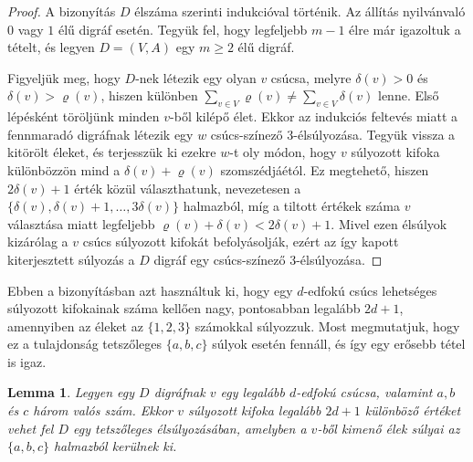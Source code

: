 \documentclass[12pt, a4paper]{report}
\newtheorem{lem}[tét]{Lemma}
\theoremstyle{remark}
\theoremstyle{definition}
\begin{document}
\begin{proof}
A bizonyítás $D$ élszáma szerinti indukcióval történik. Az állítás nyilvánvaló $0$ vagy $1$ élű digráf esetén. Tegyük fel, hogy legfeljebb $m - 1$ élre már igazoltuk a tételt, és legyen $D = (V, A)$ egy $m \geq 2$ élű digráf.

Figyeljük meg, hogy $D$-nek létezik egy olyan $v$ csúcsa, melyre $\delta(v) > 0$ és $\delta(v) > \varrho(v)$, hiszen különben $\sum\limits_{v \in V} \varrho(v) \neq \sum\limits_{v \in V} \delta(v)$ lenne. Első lépésként töröljünk minden $v$-ből kilépő élet. Ekkor az indukciós feltevés miatt a fennmaradó digráfnak létezik egy $w$ csúcs-színező 3-élsúlyozása. Tegyük vissza a kitörölt éleket, és terjesszük ki ezekre $w$-t oly módon, hogy $v$ súlyozott kifoka különbözzön mind a $\delta(v) + \varrho(v)$ szomszédjáétól. Ez megtehető, hiszen $2\delta(v) + 1$ érték közül választhatunk, nevezetesen a $\lbrace \delta(v), \delta(v) + 1, \ldots, 3\delta(v) \rbrace$ halmazból, míg a tiltott értékek száma $v$ választása miatt legfeljebb $\varrho(v) + \delta(v) < 2\delta(v) + 1$. Mivel ezen élsúlyok kizárólag a $v$ csúcs súlyozott kifokát befolyásolják, ezért az így kapott kiterjesztett súlyozás a $D$ digráf egy csúcs-színező 3-élsúlyozása.
\end{proof}

Ebben a bizonyításban azt használtuk ki, hogy egy $d$-edfokú csúcs lehetséges súlyozott kifokainak száma kellően nagy, pontosabban legalább $2d + 1$, amennyiben az éleket az $\lbrace 1, 2, 3 \rbrace$ számokkal súlyozzuk. Most megmutatjuk, hogy ez a tulajdonság tetszőleges $\lbrace a, b, c \rbrace$ súlyok esetén fennáll, és így egy erősebb tétel is igaz.

\begin{lem}
Legyen egy $D$ digráfnak $v$ egy legalább $d$-edfokú csúcsa, valamint $a, b$ és $c$ három valós szám. Ekkor $v$ súlyozott kifoka legalább $2d + 1$ különböző értéket vehet fel $D$ egy tetszőleges élsúlyozásában, amelyben a $v$-ből kimenő élek súlyai az $\lbrace a, b, c \rbrace$ halmazból kerülnek ki.
\end{lem}
\end{document}
